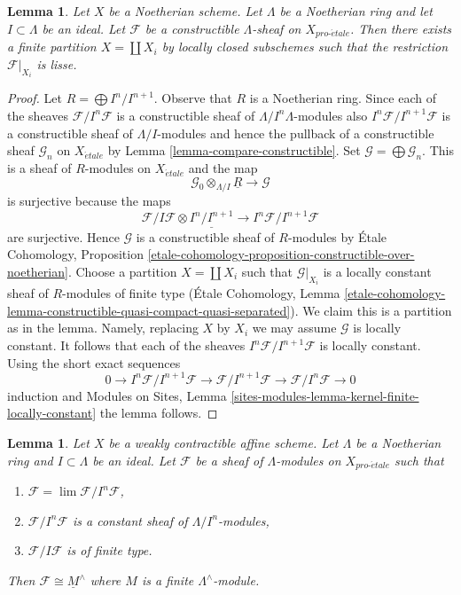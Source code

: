 \documentclass{stacks-project}
\theoremstyle{plain}
\newtheorem{lemma}[subsection]{Lemma}
\theoremstyle{definition}
\theoremstyle{remark}
\numberwithin{equation}{subsection}
\def\lim{\mathop{\mathrm{lim}}\nolimits}
\def\proetale{{pro\text{-}\acute{e}tale}}
\def\etale{{\acute{e}tale}}
\begin{document}
\begin{lemma}
\label{lemma-Noetherian-constructible}
Let $X$ be a Noetherian scheme. Let $\Lambda$ be a Noetherian ring and
let $I \subset \Lambda$ be an ideal. Let $\mathcal{F}$ be a
constructible $\Lambda$-sheaf on $X_\proetale$.
Then there exists a finite partition $X = \coprod X_i$ by
locally closed subschemes such that the restriction $\mathcal{F}|_{X_i}$
is lisse.
\end{lemma}

\begin{proof}
Let $R = \bigoplus I^n/I^{n + 1}$. Observe that $R$ is a Noetherian ring.
Since each of the sheaves
$\mathcal{F}/I^n\mathcal{F}$ is a constructible sheaf of
$\Lambda/I^n\Lambda$-modules also $I^n\mathcal{F}/I^{n + 1}\mathcal{F}$
is a constructible sheaf of $\Lambda/I$-modules and hence the pullback
of a constructible sheaf $\mathcal{G}_n$ on $X_\etale$ by
Lemma \ref{lemma-compare-constructible}.
Set $\mathcal{G} = \bigoplus \mathcal{G}_n$. This is a sheaf
of $R$-modules on $X_\etale$ and the map
$$
\mathcal{G}_0 \otimes_{\Lambda/I} \underline{R}
\longrightarrow
\mathcal{G}
$$
is surjective because the maps
$$
\mathcal{F}/I\mathcal{F} \otimes \underline{I^n/I^{n + 1}} \to
I^n\mathcal{F}/I^{n + 1}\mathcal{F}
$$
are surjective. Hence $\mathcal{G}$ is a constructible sheaf of
$R$-modules by \'Etale Cohomology, Proposition
\ref{etale-cohomology-proposition-constructible-over-noetherian}.
Choose a partition $X = \coprod X_i$ such that
$\mathcal{G}|_{X_i}$ is a locally constant sheaf of $R$-modules
of finite type (\'Etale Cohomology, Lemma
\ref{etale-cohomology-lemma-constructible-quasi-compact-quasi-separated}).
We claim this is a partition as in the lemma.
Namely, replacing $X$ by $X_i$ we may assume $\mathcal{G}$ is locally
constant. It follows that each of the sheaves
 $I^n\mathcal{F}/I^{n + 1}\mathcal{F}$
is locally constant. Using the short exact sequences
$$
0 \to I^n\mathcal{F}/I^{n + 1}\mathcal{F} \to
\mathcal{F}/I^{n + 1}\mathcal{F} \to \mathcal{F}/I^n\mathcal{F} \to 0
$$
induction and Modules on Sites, Lemma
\ref{sites-modules-lemma-kernel-finite-locally-constant}
the lemma follows.
\end{proof}

\begin{lemma}
\label{lemma-weird}
Let $X$ be a weakly contractible affine scheme. Let $\Lambda$ be a Noetherian
ring and $I \subset \Lambda$ be an ideal. Let $\mathcal{F}$ be a sheaf of
$\Lambda$-modules on $X_\proetale$ such that
\begin{enumerate}
\item $\mathcal{F} = \lim \mathcal{F}/I^n\mathcal{F}$,
\item $\mathcal{F}/I^n\mathcal{F}$ is a constant sheaf of
$\Lambda/I^n$-modules,
\item $\mathcal{F}/I\mathcal{F}$ is of finite type.
\end{enumerate}
Then $\mathcal{F} \cong \underline{M}^\wedge$ where $M$ is
a finite $\Lambda^\wedge$-module.
\end{lemma}
\end{document}
